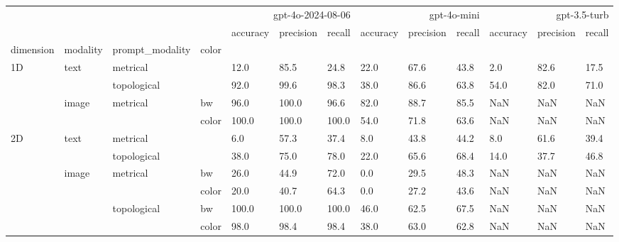 \begin{tabular}{lllllllllllll}
\toprule
 &  &  &  & \multicolumn{3}{r}{gpt-4o-2024-08-06} & \multicolumn{3}{r}{gpt-4o-mini} & \multicolumn{3}{r}{gpt-3.5-turb} \\
 &  &  &  & accuracy & precision & recall & accuracy & precision & recall & accuracy & precision & recall \\
dimension & modality & prompt_modality & color &  &  &  &  &  &  &  &  &  \\
\midrule
\multirow[t]{4}{*}{1D} & \multirow[t]{2}{*}{text} & metrical &  & 12.0 & 85.5 & 24.8 & 22.0 & 67.6 & 43.8 & 2.0 & 82.6 & 17.5 \\
\cline{3-13}
 &  & topological &  & 92.0 & 99.6 & 98.3 & 38.0 & 86.6 & 63.8 & 54.0 & 82.0 & 71.0 \\
\cline{2-13} \cline{3-13}
 & \multirow[t]{2}{*}{image} & \multirow[t]{2}{*}{metrical} & bw & 96.0 & 100.0 & 96.6 & 82.0 & 88.7 & 85.5 & NaN & NaN & NaN \\
 &  &  & color & 100.0 & 100.0 & 100.0 & 54.0 & 71.8 & 63.6 & NaN & NaN & NaN \\
\cline{1-13} \cline{2-13} \cline{3-13}
\multirow[t]{6}{*}{2D} & \multirow[t]{2}{*}{text} & metrical &  & 6.0 & 57.3 & 37.4 & 8.0 & 43.8 & 44.2 & 8.0 & 61.6 & 39.4 \\
\cline{3-13}
 &  & topological &  & 38.0 & 75.0 & 78.0 & 22.0 & 65.6 & 68.4 & 14.0 & 37.7 & 46.8 \\
\cline{2-13} \cline{3-13}
 & \multirow[t]{4}{*}{image} & \multirow[t]{2}{*}{metrical} & bw & 26.0 & 44.9 & 72.0 & 0.0 & 29.5 & 48.3 & NaN & NaN & NaN \\
 &  &  & color & 20.0 & 40.7 & 64.3 & 0.0 & 27.2 & 43.6 & NaN & NaN & NaN \\
\cline{3-13}
 &  & \multirow[t]{2}{*}{topological} & bw & 100.0 & 100.0 & 100.0 & 46.0 & 62.5 & 67.5 & NaN & NaN & NaN \\
 &  &  & color & 98.0 & 98.4 & 98.4 & 38.0 & 63.0 & 62.8 & NaN & NaN & NaN \\
\cline{1-13} \cline{2-13} \cline{3-13}
\bottomrule
\end{tabular}

